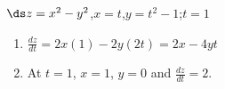 {$\ds z=x^2-y^2$,\qquad $x=t$,\qquad $y=t^2-1$;\qquad $t=1$
}
{\begin{enumerate}
	\item $\frac{dz}{dt} = 2x(1)-2y(2t) = 2x-4yt$
	
	\item		At $t=1$, $x=1$, $y=0$ and $\frac{dz}{dt} = 2$.
\end{enumerate}
}

